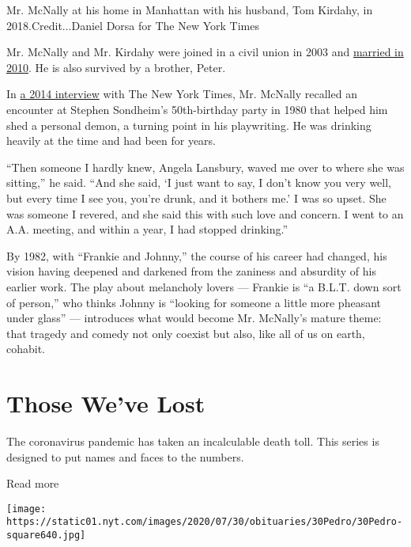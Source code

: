 Mr. McNally at his home in Manhattan with his husband, Tom Kirdahy, in
2018.Credit...Daniel Dorsa for The New York Times

Mr. McNally and Mr. Kirdahy were joined in a civil union in 2003 and
\href{https://www.nytimes.com/2017/11/15/fashion/weddings/tom-kirdahy-and-terrence-mcnally-an-immediate-and-lasting-need.html}{married
in 2010}. He is also survived by a brother, Peter.

In
\href{https://www.nytimes.com/2014/03/02/theater/mcnallys-mothers-and-sons-gauges-a-changed-america.html?searchResultPosition=3}{a
2014 interview} with The New York Times, Mr. McNally recalled an
encounter at Stephen Sondheim's 50th-birthday party in 1980 that helped
him shed a personal demon, a turning point in his playwriting. He was
drinking heavily at the time and had been for years.

``Then someone I hardly knew, Angela Lansbury, waved me over to where
she was sitting,'' he said. ``And she said, `I just want to say, I don't
know you very well, but every time I see you, you're drunk, and it
bothers me.' I was so upset. She was someone I revered, and she said
this with such love and concern. I went to an A.A. meeting, and within a
year, I had stopped drinking.''

By 1982, with ``Frankie and Johnny,'' the course of his career had
changed, his vision having deepened and darkened from the zaniness and
absurdity of his earlier work. The play about melancholy lovers ---
Frankie is ``a B.L.T. down sort of person,'' who thinks Johnny is
``looking for someone a little more pheasant under glass'' ---
introduces what would become Mr. McNally's mature theme: that tragedy
and comedy not only coexist but also, like all of us on earth, cohabit.

\href{https://www.nytimes.com/interactive/2020/obituaries/people-died-coronavirus-obituaries.html?action=click\&pgtype=Article\&state=default\&region=BELOW_MAIN_CONTENT\&context=covid_obits_promo}{}

\hypertarget{those-weve-lost}{%
\section{Those We've Lost}\label{those-weve-lost}}

The coronavirus pandemic has taken an incalculable death toll. This
series is designed to put names and faces to the numbers.

Read more

\texttt{[image: https://static01.nyt.com/images/2020/07/30/obituaries/30Pedro/30Pedro-square640.jpg]}

